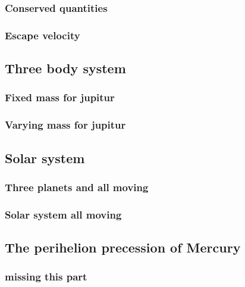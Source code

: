 \subsubsection{Conserved quantities}




\subsubsection{Escape velocity}








\subsection{Three body system}

\subsubsection{Fixed mass for jupitur}


\subsubsection{Varying mass for jupitur}




\subsection{Solar system}


\subsubsection{Three planets and all moving}


\subsubsection{Solar system all moving}





\subsection{The perihelion precession of Mercury}

\subsubsection{missing this part}